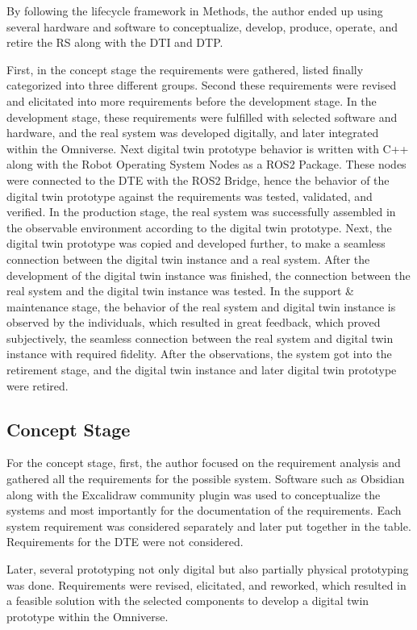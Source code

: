 \documentclass[conference]{IEEEtran}
\begin{document}
    By following the lifecycle framework in Methods, the author ended up using several hardware and software to conceptualize, develop, produce, operate, and retire the RS along with the DTI and DTP.

    First, in the concept stage the requirements were gathered, listed finally categorized into three different groups. Second these requirements were revised and elicitated into more requirements before the development stage. 
    In the development stage, these requirements were fulfilled with selected software and hardware, and the real system was developed digitally, and later integrated within the Omniverse. Next digital twin prototype behavior is written with C++ along with the Robot Operating System Nodes as a ROS2 Package. These nodes were connected to the DTE with the ROS2 Bridge, hence the behavior of the digital twin prototype against the requirements was tested, validated, and verified. 
    In the production stage, the real system was successfully assembled in the observable environment according to the digital twin prototype. Next, the digital twin prototype was copied and developed further,  to make a seamless connection between the digital twin instance and a real system. After the development of the digital twin instance was finished, the connection between the real system and the digital twin instance was tested. 
    In the support \& maintenance stage, the behavior of the real system and digital twin instance is observed by the individuals, which resulted in great feedback, which proved subjectively, the seamless connection between the real system and digital twin instance with required fidelity. 
    After the observations, the system got into the retirement stage, and the digital twin instance and later digital twin prototype were retired.

    \subsection{Concept Stage}
    For the concept stage, first, the author focused on the requirement analysis and gathered all the requirements for the possible system. Software such as Obsidian along with the Excalidraw community plugin was used to conceptualize the systems and most importantly 
    for the documentation of the requirements. Each system requirement was considered separately and later put together in the table. Requirements for the DTE were not considered.    

    Later, several prototyping not only digital but also partially physical prototyping was done. 
    Requirements were revised, elicitated, and reworked, which resulted in a feasible solution with the selected components to develop a digital twin prototype within the Omniverse.
    
\end{document}

